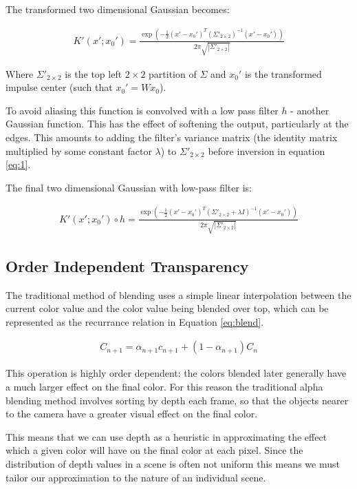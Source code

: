 \documentclass{article}
\begin{document}
The transformed two dimensional Gaussian becomes:

\begin{align} \label{eq:1}
K'(x';x_0') = \frac{ \exp\left(-\frac{1}{2}{(x'-x_0')^T(\Sigma'_{2\times 2})^{-1}(x'-x_0')}\right) }{2\pi\sqrt{|\Sigma'_{2\times 2}|}}
\end{align}

Where $\Sigma'_{2\times 2}$ is the top left $2\times 2$ partition of $\Sigma$ and $x_0'$ is the transformed impulse center (such that $x_0'=Wx_0$).

To avoid aliasing this function is convolved with a low pass filter $h$ - another Gaussian function. This has the effect of softening the output, particularly at the edges. This amounts to adding the filter's variance matrix (the identity matrix multiplied by some constant factor $\lambda$) to $\Sigma'_{2\times 2}$ before inversion in equation \ref{eq:1}.

The final two dimensional Gaussian with low-pass filter is:

\begin{align} \label{eq:2}
K'(x';x_0')\circ h = \frac{ \exp\left(-\frac{1}{2}{(x'-x_0')^T(\Sigma'_{2\times 2} + \lambda I)^{-1}(x'-x_0')}\right) }{2\pi\sqrt{|\Sigma'_{2\times 2}|}}
\end{align}

\subsection{Order Independent Transparency}

The traditional method of blending uses a simple linear interpolation between the current color value and the color value being blended over top, which can be represented as the recurrance relation in Equation \ref{eq:blend}.

\begin{align} \label{eq:blend}
C_{n+1} = \alpha_{n+1} c_{n+1} + (1-\alpha_{n+1}) C_{n}
\end{align}

This operation is highly order dependent: the colors blended later generally have a much larger effect on the final color. For this reason the traditional alpha blending method involves sorting by depth each frame, so that the objects nearer to the camera have a greater visual effect on the final color.

This means that we can use depth as a heuristic in approximating the effect which a given color will have on the final color at each pixel. Since the distribution of depth values in a scene is often not uniform this means we must tailor our approximation to the nature of an individual scene.
\end{document}
